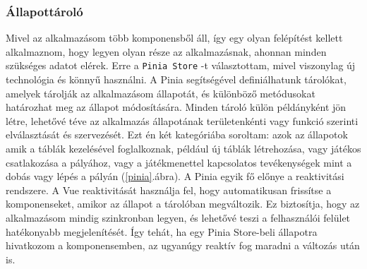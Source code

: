 \documentclass[a4paper,twoside]{article}
\begin{document}
\subsubsection{Állapottároló}
Mivel az alkalmazásom több komponensből áll, így egy olyan felépítést kellett alkalmaznom, hogy legyen olyan része 
az alkalmazásnak, ahonnan minden szükséges adatot elérek. Erre a \verb|Pinia Store| \cite{pinia}-t választottam, mivel viszonylag új technológia és könnyű használni. 
A Pinia segítségével definiálhatunk tárolókat, amelyek tárolják az alkalmazásom állapotát,
és különböző metódusokat határozhat meg az állapot módosítására. Minden tároló külön
példányként jön létre, lehetővé téve az alkalmazás állapotának területenkénti vagy funkció
szerinti elválasztását és \mbox{szervezését}. Ezt én két kategóriába soroltam: azok az állapotok amik a táblák kezelésével foglalkoznak, például új táblák
létrehozása, vagy játékos csatlakozása a pályához, vagy a játékmenettel kapcsolatos tevékenységek mint a dobás vagy lépés a pályán (\ref{pinia}.ábra). 
A Pinia egyik fő előnye a reaktivitási rendszere. A Vue reaktivitását használja fel, hogy
automatikusan frissítse a komponenseket, amikor az állapot a tárolóban megváltozik. Ez
biztosítja, hogy az alkalmazásom mindig szinkronban legyen, és lehetővé teszi a
felhasználói felület hatékonyabb megjelenítését. Így tehát, ha egy Pinia Store-beli állapotra hivatkozom a komponensemben, az ugyanúgy reaktív fog maradni a változás után is. 
\end{document}
